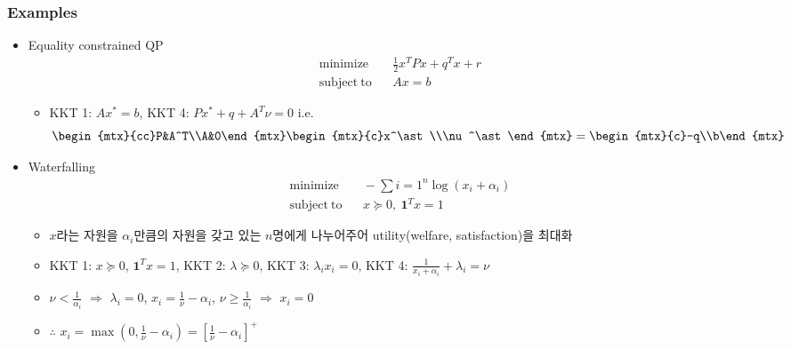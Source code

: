\subsubsection*{Examples}
\begin{itemize}
    \item Equality constrained QP
        $$ \begin{aligned}
            \mathrm{minimize}~~&~~\frac{1}{2}x^TPx + q^Tx + r \\
            \mathrm{subject~to}~~&~~Ax = b
        \end{aligned} $$
    \begin{itemize}
        \item KKT 1: $Ax^\ast = b$, KKT 4: $Px^\ast + q + A^T\nu = 0$ i.e.
            $$ \begin{mtx}{cc}P&A^T\\A&0\end{mtx}\begin{mtx}{c}x^\ast\\\nu^\ast\end{mtx}=\begin{mtx}{c}-q\\b\end{mtx} $$
    \end{itemize}
    \item Waterfalling
        $$ \begin{aligned}
            \mathrm{minimize}~~&~~-\sum{i=1}^n \log(x_i + \alpha_i) \\
            \mathrm{subject~to}~~&~~x\succeq 0,~\mathbf{1}^Tx = 1
        \end{aligned} $$
    \begin{itemize}
        \item $x$라는 자원을 $\alpha_i$만큼의 자원을 갖고 있는 $n$명에게 나누어주어 utility(welfare, satisfaction)을 최대화
        \item KKT 1: $x\succeq 0$, $\mathbf{1}^Tx = 1$, KKT 2: $\lambda\succeq 0$, KKT 3: $\lambda_i x_i = 0$, KKT 4: $\frac{1}{x_i+\alpha_i}+\lambda_i=\nu$
        \item $\nu<\frac{1}{\alpha_i}$ $\Rightarrow$ $\lambda_i=0$, $x_i = \frac{1}{\nu}-\alpha_i$, $\nu\geq\frac{1}{\alpha_i}$ $\Rightarrow$ $x_i = 0$
        \item $\therefore$ $x_i = \max(0, \frac{1}{\nu}-\alpha_i) = \left[\frac{1}{\nu}-\alpha_i\right]^+$
    \end{itemize}
    \begin{figures}
    \end{figures}
\end{itemize}

